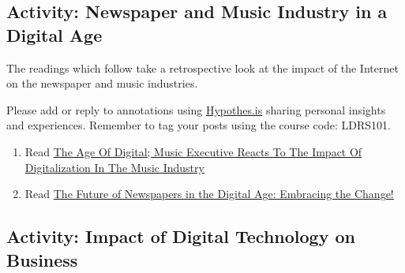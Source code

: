 \documentclass[
]{book}
\providecommand{\tightlist}{%
  \setlength{\itemsep}{0pt}\setlength{\parskip}{0pt}}
\theoremstyle{definition}
\theoremstyle{definition}
\theoremstyle{definition}
\theoremstyle{definition}
\theoremstyle{remark}
\begin{document}
\hypertarget{activity-newspaper-and-music-industry-in-a-digital-age}{%
\subsection*{Activity: Newspaper and Music Industry in a Digital Age}\label{activity-newspaper-and-music-industry-in-a-digital-age}}

\begin{reflect}
The readings which follow take a retrospective look at the impact of the Internet on the newspaper and music industries.

Please add or reply to annotations using \href{https://web.hypothes.is/}{Hypothes.is} sharing personal insights and experiences. Remember to tag your posts using the course code: LDRS101.

\begin{enumerate}
\def\labelenumi{\arabic{enumi}.}
\tightlist
\item
  Read \href{https://www.forbes.com/sites/joshwilson/2022/09/14/the-age-of-digital-music-executive-reacts-to-the-impact-of-digitalization-in-the-music-industry/?sh=1ca7f385537b}{The Age Of Digital; Music Executive Reacts To The Impact Of Digitalization In The Music Industry}
\item
  Read \href{https://medium.com/@kumarpriyanshu025/the-future-of-newspapers-in-the-digital-age-embracing-the-change-fe835bd8d52f}{The Future of Newspapers in the Digital Age: Embracing the Change!}
\end{enumerate}
\end{reflect}

\hypertarget{activity-impact-of-digital-technology-on-business}{%
\subsection*{Activity: Impact of Digital Technology on Business}\label{activity-impact-of-digital-technology-on-business}}
\end{document}
